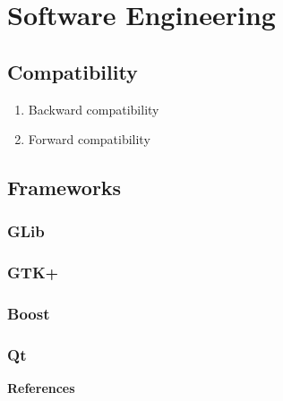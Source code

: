 \documentclass[12pt,a4paper]{article}
\begin{document}
\section{Software Engineering}

\subsection{Compatibility}

\begin{enumerate}
\item Backward compatibility
\item Forward compatibility
\end{enumerate}

\subsection{Frameworks}

\subsubsection{GLib}

\subsubsection{GTK+}

\subsubsection{Boost}

\subsubsection{Qt}

\textbf{References}
\end{document}
